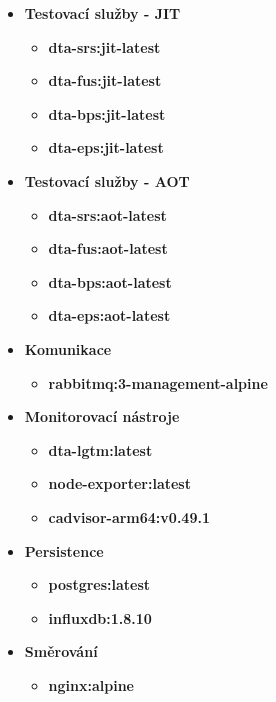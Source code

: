 \begin{itemize}
    \item \textbf{Testovací služby - JIT}
    \begin{itemize}
        \item \textbf{dta-srs:jit-latest}
        \item \textbf{dta-fus:jit-latest}
        \item \textbf{dta-bps:jit-latest}
        \item \textbf{dta-eps:jit-latest}
    \end{itemize}
    \item \textbf{Testovací služby - AOT}
    \begin{itemize}
        \item \textbf{dta-srs:aot-latest}
        \item \textbf{dta-fus:aot-latest}
        \item \textbf{dta-bps:aot-latest}
        \item \textbf{dta-eps:aot-latest}
    \end{itemize}
    \item \textbf{Komunikace}
    \begin{itemize}
        \item \textbf{rabbitmq:3-management-alpine}
    \end{itemize}
    \item \textbf{Monitorovací nástroje}
    \begin{itemize}
        \item \textbf{dta-lgtm:latest}
        \item \textbf{node-exporter:latest}
        \item \textbf{cadvisor-arm64:v0.49.1}
    \end{itemize}
    \item \textbf{Persistence}
    \begin{itemize}
        \item \textbf{postgres:latest}
        \item \textbf{influxdb:1.8.10}
    \end{itemize}
    \item \textbf{Směrování}
    \begin{itemize}
        \item \textbf{nginx:alpine}
    \end{itemize}

\end{itemize}


